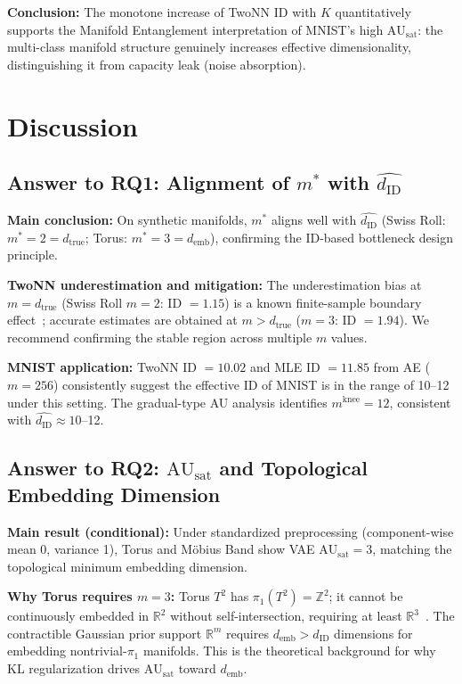 \documentclass[lettersize,journal]{IEEEtran}
\newcommand{\dID}{d_{\mathrm{ID}}}
\newcommand{\dtrue}{d_{\mathrm{true}}}
\newcommand{\R}{\mathbb{R}}
\newcommand{\AUsat}{\mathrm{AU}_{\mathrm{sat}}}
\newcommand{\demb}{d_{\mathrm{emb}}}
\begin{document}
\textbf{Conclusion:}
The monotone increase of TwoNN ID with $K$ quantitatively supports the Manifold Entanglement interpretation of MNIST's high $\AUsat$: the multi-class manifold structure genuinely increases effective dimensionality, distinguishing it from capacity leak (noise absorption).

\section{Discussion}\label{sec:discussion}

\subsection{Answer to RQ1: Alignment of $m^*$ with $\hat{\dID}$}\label{sec:disc_rq1}

\textbf{Main conclusion:}
On synthetic manifolds, $m^*$ aligns well with $\hat{\dID}$ (Swiss Roll: $m^* = 2 = \dtrue$; Torus: $m^* = 3 = \demb$), confirming the ID-based bottleneck design principle.

\textbf{TwoNN underestimation and mitigation:}
The underestimation bias at $m = \dtrue$ (Swiss Roll $m=2$: ID $= 1.15$) is a known finite-sample boundary effect~\cite{facco2017twonn}; accurate estimates are obtained at $m > \dtrue$ ($m=3$: ID $= 1.94$).
We recommend confirming the stable region across multiple $m$ values.

\textbf{MNIST application:}
TwoNN ID $= 10.02$ and MLE ID $= 11.85$ from AE ($m=256$) consistently suggest the effective ID of MNIST is in the range of 10--12 under this setting.
The gradual-type AU analysis identifies $m^\mathrm{knee} = 12$, consistent with $\hat{\dID} \approx 10$--12.

\subsection{Answer to RQ2: $\AUsat$ and Topological Embedding Dimension}\label{sec:discussion_topology}

\textbf{Main result (conditional):}
Under standardized preprocessing (component-wise mean 0, variance 1), Torus and M\"{o}bius Band show VAE $\AUsat = 3$, matching the topological minimum embedding dimension.

\textbf{Why Torus requires $m=3$:}
Torus $T^2$ has $\pi_1(T^2) = \mathbb{Z}^2$; it cannot be continuously embedded in $\R^2$ without self-intersection, requiring at least $\R^3$~\cite{fefferman2016manifold,hatcher2002algebraic}.
The contractible Gaussian prior support $\R^m$ requires $\demb > \dID$ dimensions for embedding nontrivial-$\pi_1$ manifolds.
This is the theoretical background for why KL regularization drives $\AUsat$ toward $\demb$.
\end{document}
